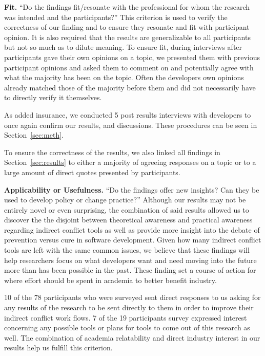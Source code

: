 \documentclass[conference]{IEEEtran}
\begin{document}
{\bfseries Fit.} ``Do the findings fit/resonate with the professional for whom the research was intended and the participants?'' This
criterion is used to verify the correctness of our finding and to ensure they resonate and fit with participant opinion. It is also
required that the results are generalizable to all participants but not so much as to dilute meaning. To ensure fit, during interviews
after participants gave their own opinions on a topic, we presented them with previous participant opinions and asked them to comment
on and potentially agree with what the majority has been on the topic. Often the developers own opinions already matched those of
the majority before them and did not necessarily have to directly verify it themselves.

As added insurance, we conducted 5 post results interviews with developers to once again confirm our results, and discussions. These
procedures can be seen in Section~\ref{sec:meth}.

To ensure the correctness of the results, we also linked all findings in Section~\ref{sec:results} to either a majority of agreeing
responses on a topic or to a large amount of direct quotes presented by participants.

{\bfseries Applicability or Usefulness.} ``Do the findings offer new insights? Can they be used to develop policy or change practice?''
Although our results may not be entirely novel or even surprising, the combination of said results allowed us to discover the
the disjoint between theoretical awareness and practical awareness regarding indirect conflict tools as well as provide more
insight into the debate of prevention versus cure in software development. Given how many indirect conflict tools are left with the same common
issues, we believe that these findings will help researchers focus on what developers want and need moving into the future more than has
been possible in the past. These finding set a course of action for where effort should be spent in academia to better benefit industry.

10 of the 78 participants who were surveyed sent direct responses to us asking for any results of the research to be sent directly to
them in order to improve their indirect conflict work flows. 7 of the 19 participants survey expressed interest concerning any possible
tools or plans for tools to come out of this research as well. The combination of academia relatability and direct industry interest 
in our results help us fulfill this criterion.
\end{document}
